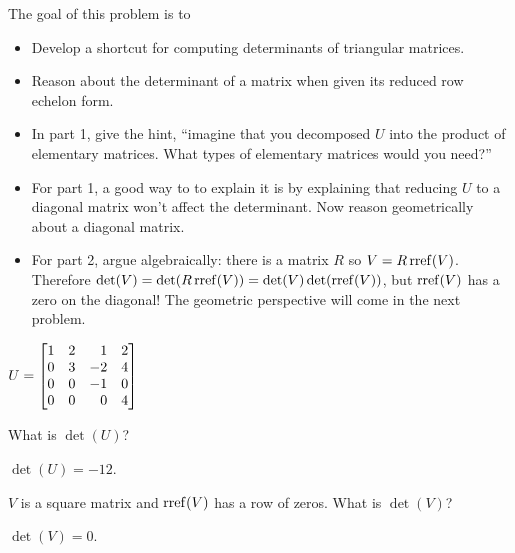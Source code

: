 \documentclass{problemset}
\newcommand{\bookonlynewpage}{\begin{bookonly}\newpage\end{bookonly}}
\begin{document}
	\bookonlynewpage
	\question
	\begin{annotation}
		\begin{goals}

			The goal of this problem is to
			\begin{itemize}
				\item Develop a shortcut for computing determinants of triangular matrices.
				\item Reason about the determinant of a matrix when given its reduced
					row echelon form.
			\end{itemize}
		\end{goals}

		\begin{notes}
			\begin{itemize}
				\item In part 1, give the hint, ``imagine that you decomposed
					$U$ into the product of elementary matrices. What types of
					elementary matrices would you need?''
				\item For part 1, a good way to to explain it is by explaining that 
					reducing $U$ to a diagonal matrix won't affect the determinant.
					Now reason geometrically about a diagonal matrix.
				\item For part 2, argue algebraically: there is a matrix $R$ so $V=R\operatorname{rref}(V)$.
					Therefore $\det(V)=\det(R\operatorname{rref}(V))=\det(V)\det(\operatorname{rref}(V))$, but $\operatorname{rref}(V)$
					has a zero on the diagonal! The geometric perspective will come in the next problem.
			\end{itemize}
		\end{notes}
	\end{annotation}
	$U=\mat{1&2&1&2\\0&3&-2&4\\0&0&-1&0\\0&0&0&4}$
	\begin{parts}
		\item What is $\det(U)$?
			\begin{solution}
				$\det(U)=-12$.
			\end{solution}
		\item $V$ is a square matrix and $\operatorname{rref}(V)$ has a row of zeros.
			What is $\det(V)$?
			\begin{solution}
				$\det(V)=0$.
			\end{solution}
	\end{parts}
	
\end{document}
